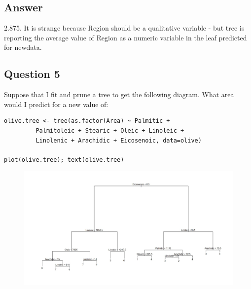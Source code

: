 \documentclass[caret-main.tex]{subfiles}
\begin{document}
\subsection*{Answer}
2.875. It is strange because Region should be a qualitative variable - but tree is reporting the average value of Region as a numeric variable in the leaf predicted for newdata.

\newpage
\subsection*{Question 5}
Suppose that I fit and prune a tree to get the following diagram. What area
would I predict for a new value of:
\begin{framed}
\begin{verbatim}
olive.tree <- tree(as.factor(Area) ~ Palmitic + 
         Palmitoleic + Stearic + Oleic + Linoleic + 
         Linolenic + Arachidic + Eicosenoic, data=olive)

plot(olive.tree); text(olive.tree)
\end{verbatim}
\end{framed}
\begin{figure}[h!]
\centering
\includegraphics[width=1.19\linewidth]{./DAquiz6q5a}
\caption{}
\label{fig:DAquiz6q5a}
\end{figure}

\end{document}
